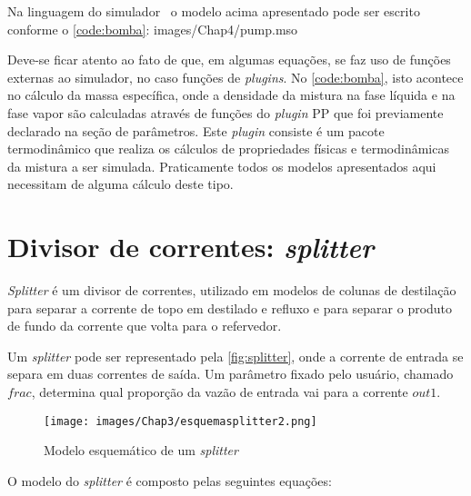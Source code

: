 
Na linguagem do simulador \emso\ o modelo acima apresentado pode ser escrito
conforme o \autoref{code:bomba}:  {images/Chap4/pump.mso}

Deve-se ficar atento ao fato de que, em algumas equações, se faz uso de funções externas ao simulador, no caso
funções de \textit{plugins}. No \autoref{code:bomba}, isto acontece no cálculo da massa específica, onde a
densidade da mistura na fase líquida e na fase vapor são calculadas através de funções do \textit{plugin} PP
que foi previamente declarado na seção de parâmetros. Este \textit{plugin} consiste é um pacote termodinâmico
que realiza os cálculos de propriedades físicas e termodinâmicas da mistura a ser simulada. Praticamente todos os
modelos apresentados aqui necessitam de alguma cálculo deste tipo.


\section{Divisor de correntes: \textit{splitter}} \label{sec:modelosplitter}
\textit{Splitter} é um divisor de correntes, utilizado em modelos de colunas de destilação para separar a corrente
de topo em destilado e refluxo e para separar o produto de fundo da corrente que volta para
o refervedor.

Um \textit{splitter} pode ser representado pela \autoref{fig:splitter}, onde a corrente de entrada se
separa em duas correntes de saída. Um parâmetro fixado pelo usuário, chamado $frac$, determina qual proporção da vazão de
entrada vai para a corrente $out1$.
\begin{figure}[htb]
\centering \texttt{[image: images/Chap3/esquemasplitter2.png]}
\caption{Modelo esquemático de um \textit{splitter}}
\label{fig:splitter}
\end{figure}

O modelo do \textit{splitter} é composto pelas seguintes equações:

